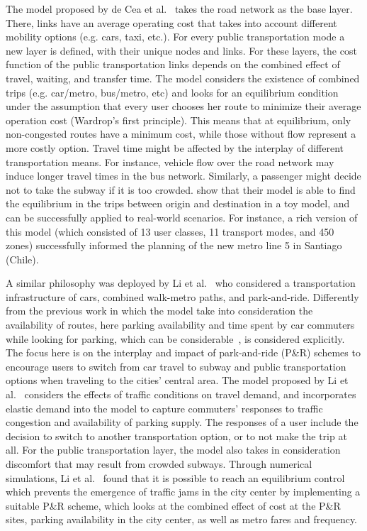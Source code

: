 The model proposed by de Cea et al.~\cite{decea2005equilibrium} takes the road network as the base layer. There, links have an average operating cost that takes into account different mobility options (e.g. cars, taxi, etc.). For every public transportation mode a new layer is defined, with their unique nodes and links. For these layers, the cost function of the public transportation links depends on the combined effect of travel, waiting, and transfer time. The model considers the existence of combined trips (e.g. car/metro, bus/metro, etc) and looks for an equilibrium condition under the assumption that every user chooses her route to minimize their average operation cost (Wardrop’s first principle). This means that at equilibrium, only non-congested routes have a minimum cost, while those without flow represent a more costly option. Travel time might be affected by the interplay of different transportation means. For instance, vehicle flow over the road network may induce longer travel times in the bus network. Similarly, a passenger might decide not to take the subway if it is too crowded. \cite{decea2005equilibrium} show that their model is able to find the equilibrium in the trips between origin and destination in a toy model, and can be successfully applied to real-world scenarios. For instance, a rich version of this model (which consisted of 13 user classes, 11 transport modes, and 450 zones) successfully informed the planning of the new metro line 5 in Santiago (Chile).

A similar philosophy was deployed by Li et al.~\cite{li2007parkride} who considered a transportation infrastructure of cars, combined walk-metro paths, and park-and-ride. Differently from the previous work in which the model take into consideration the availability of routes, here parking availability and time spent by car commuters while looking for parking, which can be considerable~\cite{shoup2017high}, is considered explicitly. The focus here is on the interplay and impact of park-and-ride (P\&R) schemes to encourage users to switch from car travel to subway and public transportation options when traveling to the cities' central area. The model proposed by Li et al.~\cite{li2007parkride} considers the effects of traffic conditions on travel demand, and incorporates elastic demand into the model to capture commuters’ responses to traffic congestion and availability of parking supply. The responses of a user include the decision to switch to another transportation option, or to not make the trip at all. For the public transportation layer, the model also takes in consideration discomfort that may result from crowded subways. Through numerical simulations, Li et al.~\cite{li2007parkride} found that it is possible to reach an equilibrium control which prevents the emergence of traffic jams in the city center by implementing a suitable P\&R scheme, which looks at the combined effect of cost at the P\&R sites, parking availability in the city center, as well as metro fares and frequency.

